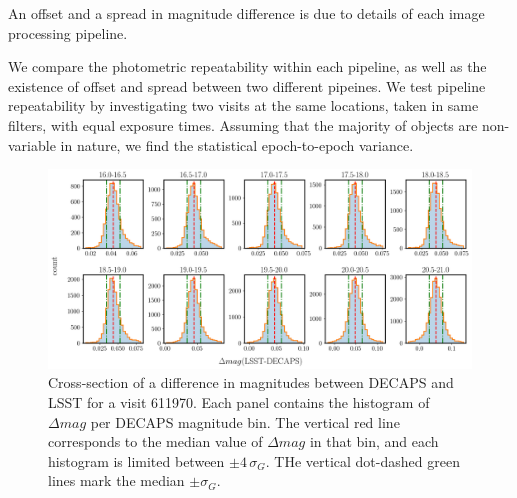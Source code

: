 \documentclass[DM,lsstdraft,toc,usenatbib]{lsstdoc}
\begin{document}
An offset and a spread in magnitude difference is due to details of each image processing pipeline.

We compare the photometric repeatability within each pipeline, as well as the existence of offset and spread between two different pipeines. We test pipeline repeatability by investigating two visits at the same locations,  taken in same filters, with equal exposure times.  Assuming that the majority of objects are non-variable in nature, we find the statistical epoch-to-epoch variance. 


\begin{figure}
\includegraphics[width=1.0\columnwidth]{figs/rms_decaps_lsst_611970hist_panel.png}
\caption{Cross-section of a difference in magnitudes between DECAPS and LSST for a visit 611970. Each panel contains the histogram of $\Delta mag$ per DECAPS magnitude bin. The vertical red line corresponds to the median value of $\Delta mag$ in that bin, and each histogram is limited between $\pm 4 \, \sigma_{G}$. THe vertical dot-dashed green lines mark the median $\pm \sigma_{G}$. }
\label{fig:dmag_hist}
\end{figure} 
\end{document}
